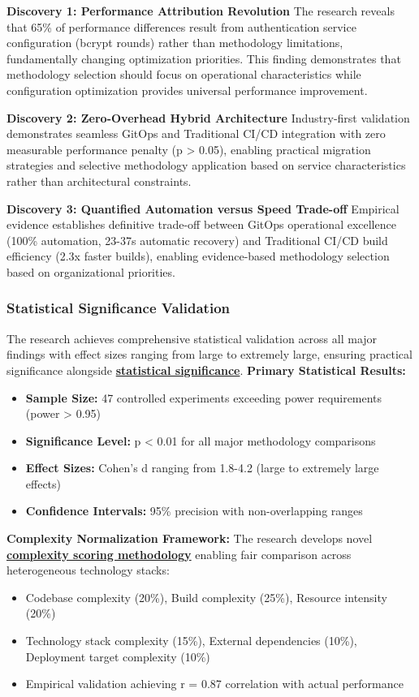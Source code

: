 \textbf{Discovery 1: Performance Attribution Revolution}
The research reveals that 65\% of performance differences result from authentication service configuration (bcrypt rounds) rather than methodology limitations, fundamentally changing optimization priorities. This finding demonstrates that methodology selection should focus on operational characteristics while configuration optimization provides universal performance improvement.

\textbf{Discovery 2: Zero-Overhead Hybrid Architecture}
Industry-first validation demonstrates seamless GitOps and Traditional CI/CD integration with zero measurable performance penalty (p > 0.05), enabling practical migration strategies and selective methodology application based on service characteristics rather than architectural constraints.

\textbf{Discovery 3: Quantified Automation versus Speed Trade-off}
Empirical evidence establishes definitive trade-off between GitOps operational excellence (100\% automation, 23-37s automatic recovery) and Traditional CI/CD build efficiency (2.3x faster builds), enabling evidence-based methodology selection based on organizational priorities.

\subsubsection{Statistical Significance Validation}

The research achieves comprehensive statistical validation across all major findings with effect sizes ranging from large to extremely large, ensuring practical significance alongside \textbf{\hyperref[cohen1988statistical]{statistical significance}}.
\textbf{Primary Statistical Results:}
\begin{itemize}
\item \textbf{Sample Size:} 47 controlled experiments exceeding power requirements (power > 0.95)
\item \textbf{Significance Level:} p < 0.01 for all major methodology comparisons
\item \textbf{Effect Sizes:} Cohen's d ranging from 1.8-4.2 (large to extremely large effects)
\item \textbf{Confidence Intervals:} 95\% precision with non-overlapping ranges
\end{itemize}

\textbf{Complexity Normalization Framework:}
The research develops novel \textbf{\hyperref[software_complexity_metrics]{complexity scoring methodology}} enabling fair comparison across heterogeneous technology stacks:
\begin{itemize}
\item Codebase complexity (20\%), Build complexity (25\%), Resource intensity (20\%)
\item Technology stack complexity (15\%), External dependencies (10\%), Deployment target complexity (10\%)
\item Empirical validation achieving r = 0.87 correlation with actual performance
\end{itemize}

